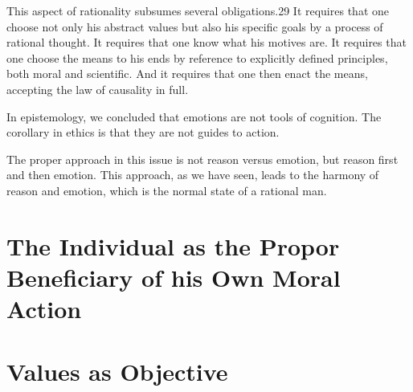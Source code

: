         This aspect of rationality subsumes several obligations.29 It requires that one choose not only his abstract values but also his specific goals by a process of rational thought. It requires that one know what his motives are. It requires that one choose the means to his ends by reference to explicitly defined principles, both moral and scientific. And it requires that one then enact the means, accepting the law of causality in full.

        In epistemology, we concluded that emotions are not tools of cognition. The corollary in ethics is that they are not guides to action.

        The proper approach in this issue is not reason versus emotion, but reason first and then emotion. This approach, as we have seen, leads to the harmony of reason and emotion, which is the normal state of a rational man. 


    \section{The Individual as the Propor Beneficiary of his Own Moral Action}

    \section{Values as Objective}